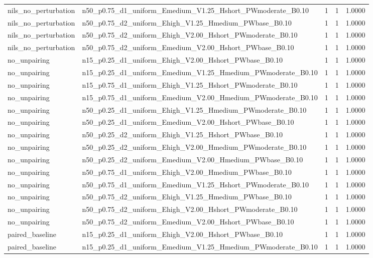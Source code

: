 \begin{tabular}{llrrr}
nils_no_perturbation & n50_p0.75_d1_uniform_Emedium_V1.25_Hshort_PWmoderate_B0.10 & 1 & 1 & 1.0000 \\
nils_no_perturbation & n50_p0.75_d2_uniform_Ehigh_V1.25_Hmedium_PWbase_B0.10 & 1 & 1 & 1.0000 \\
nils_no_perturbation & n50_p0.75_d2_uniform_Ehigh_V2.00_Hshort_PWmoderate_B0.10 & 1 & 1 & 1.0000 \\
nils_no_perturbation & n50_p0.75_d2_uniform_Emedium_V2.00_Hshort_PWbase_B0.10 & 1 & 1 & 1.0000 \\
no_unpairing & n15_p0.25_d1_uniform_Ehigh_V2.00_Hshort_PWbase_B0.10 & 1 & 1 & 1.0000 \\
no_unpairing & n15_p0.25_d1_uniform_Emedium_V1.25_Hmedium_PWmoderate_B0.10 & 1 & 1 & 1.0000 \\
no_unpairing & n15_p0.75_d1_uniform_Ehigh_V1.25_Hshort_PWmoderate_B0.10 & 1 & 1 & 1.0000 \\
no_unpairing & n15_p0.75_d1_uniform_Emedium_V2.00_Hmedium_PWmoderate_B0.10 & 1 & 1 & 1.0000 \\
no_unpairing & n50_p0.25_d1_uniform_Ehigh_V1.25_Hmedium_PWmoderate_B0.10 & 1 & 1 & 1.0000 \\
no_unpairing & n50_p0.25_d1_uniform_Emedium_V2.00_Hshort_PWbase_B0.10 & 1 & 1 & 1.0000 \\
no_unpairing & n50_p0.25_d2_uniform_Ehigh_V1.25_Hshort_PWbase_B0.10 & 1 & 1 & 1.0000 \\
no_unpairing & n50_p0.25_d2_uniform_Ehigh_V2.00_Hmedium_PWmoderate_B0.10 & 1 & 1 & 1.0000 \\
no_unpairing & n50_p0.25_d2_uniform_Emedium_V2.00_Hmedium_PWbase_B0.10 & 1 & 1 & 1.0000 \\
no_unpairing & n50_p0.75_d1_uniform_Ehigh_V2.00_Hmedium_PWbase_B0.10 & 1 & 1 & 1.0000 \\
no_unpairing & n50_p0.75_d1_uniform_Emedium_V1.25_Hshort_PWmoderate_B0.10 & 1 & 1 & 1.0000 \\
no_unpairing & n50_p0.75_d2_uniform_Ehigh_V1.25_Hmedium_PWbase_B0.10 & 1 & 1 & 1.0000 \\
no_unpairing & n50_p0.75_d2_uniform_Ehigh_V2.00_Hshort_PWmoderate_B0.10 & 1 & 1 & 1.0000 \\
no_unpairing & n50_p0.75_d2_uniform_Emedium_V2.00_Hshort_PWbase_B0.10 & 1 & 1 & 1.0000 \\
paired_baseline & n15_p0.25_d1_uniform_Ehigh_V2.00_Hshort_PWbase_B0.10 & 1 & 1 & 1.0000 \\
paired_baseline & n15_p0.25_d1_uniform_Emedium_V1.25_Hmedium_PWmoderate_B0.10 & 1 & 1 & 1.0000 \\

\end{tabular}
